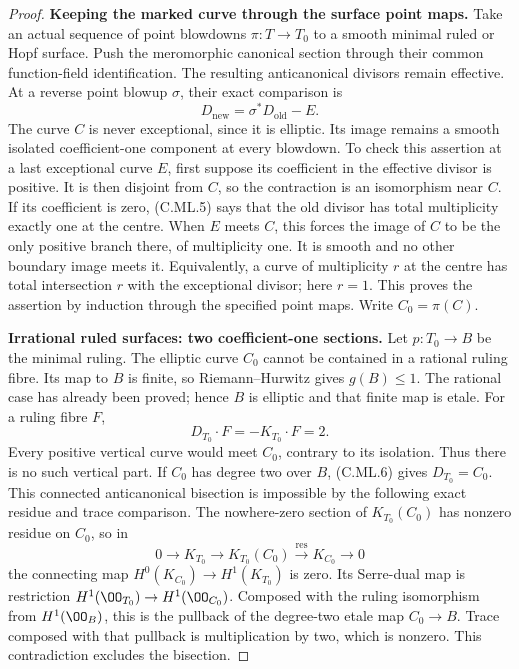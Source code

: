 \begin{proof}
\par\medskip\noindent\textbf{Keeping the marked curve through the surface point maps.}
Take an actual sequence of point blowdowns
\(\pi:T\to T_0\) to a smooth minimal ruled or Hopf
surface. Push the meromorphic canonical section
through their common function-field identification.
The resulting anticanonical divisors remain effective.
At a reverse point blowup \(\sigma\), their exact
comparison is
\[
                 D_{\mathrm{new}}=\sigma^*D_{\mathrm{old}}-E.
\tag{C.ML.5}
\]
The curve \(C\) is never exceptional, since it is
elliptic. Its image remains a smooth isolated
coefficient-one component at every blowdown. To
check this assertion at a last exceptional curve
\(E\), first suppose its coefficient in the
effective divisor is positive. It is then disjoint
from \(C\), so the contraction is an isomorphism
near \(C\). If its coefficient is zero, (C.ML.5)
says that the old divisor has total multiplicity
exactly one at the centre. When \(E\) meets \(C\),
this forces the image of \(C\) to be the only
positive branch there, of multiplicity one. It is
smooth and no other boundary image meets it.
Equivalently, a curve of multiplicity \(r\) at
the centre has total intersection \(r\) with
the exceptional divisor; here \(r=1\).
This proves the assertion by induction through
the specified point maps. Write \(C_0=\pi(C)\).

\par\medskip\noindent\textbf{Irrational ruled surfaces: two coefficient-one sections.}
Let \(p:T_0\to B\) be the minimal ruling. The
elliptic curve \(C_0\) cannot be contained in a
rational ruling fibre. Its map to \(B\) is finite,
so Riemann--Hurwitz gives \(g(B)\le1\).
The rational case has already been proved; hence
\(B\) is elliptic and that finite map is etale.
For a ruling fibre \(F\),
\[
                 D_{T_0}\cdot F=-K_{T_0}\cdot F=2.
\tag{C.ML.6}
\]
Every positive vertical curve would meet \(C_0\),
contrary to its isolation. Thus there is no such
vertical part. If \(C_0\) has degree two over
\(B\), (C.ML.6) gives \(D_{T_0}=C_0\).
This connected anticanonical bisection is impossible
by the following exact residue and trace comparison.
The nowhere-zero section of \(K_{T_0}(C_0)\)
has nonzero residue on \(C_0\), so in
\[
 0\longrightarrow K_{T_0}\longrightarrow K_{T_0}(C_0)
       \xrightarrow{\operatorname{res}}K_{C_0}\longrightarrow0
\tag{C.ML.7}
\]
the connecting map \(H^0(K_{C_0})\to H^1(K_{T_0})\)
is zero. Its Serre-dual map is restriction
\(H^1(\OO_{T_0})\to H^1(\OO_{C_0})\).
Composed with the ruling isomorphism from
\(H^1(\OO_B)\), this is the pullback of the
degree-two etale map \(C_0\to B\). Trace composed
with that pullback is multiplication by two,
which is nonzero. This contradiction excludes
the bisection.


\end{proof}
